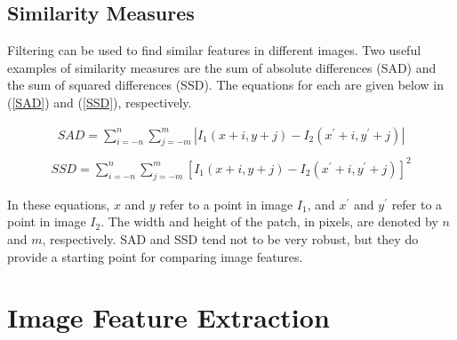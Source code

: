 \documentclass[twoside]{article}
\begin{document}
\subsection{Similarity Measures}
Filtering can be used to find similar features in different images. Two useful examples of similarity measures are the sum of absolute differences (SAD) and the sum of squared differences (SSD). The equations for each are given below in (\ref{SAD}) and (\ref{SSD}), respectively. 

\begin{equation}
  \label{SAD}
  \begin{aligned}
  	SAD = \sum_{i=-n}^n \sum_{j=-m}^m |I_1(x+i,y+j)-I_2(x^\prime+i,y^\prime+j)|\\
  \end{aligned}
\end{equation}
\begin{equation}
  \label{SSD}
  \begin{aligned}
	SSD = \sum_{i=-n}^n \sum_{j=-m}^m [I_1(x+i,y+j)-I_2(x^\prime+i,y^\prime+j)]^2
  \end{aligned}
\end{equation}

In these equations, $x$ and $y$ refer to a point in image $I_1$, and $x^\prime$ and $y^\prime$ refer to a point in image $I_2$. 
The width and height of the patch, in pixels, are denoted by $n$ and $m$, respectively. SAD and SSD tend not to be very robust, but they do provide a starting point for comparing image features.






\section{Image Feature Extraction}
\end{document}

